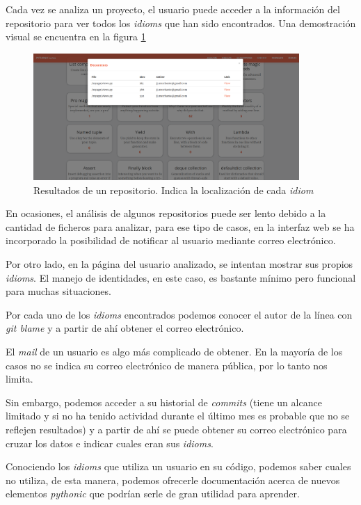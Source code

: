 \documentclass[a4paper, 12pt]{book}
\begin{document}
Cada vez se analiza un proyecto, el usuario puede acceder a la información del repositorio para ver todos los \textit{idioms} que han sido encontrados. Una demostración visual se encuentra en la figura \ref{fig:resultrepo}

\begin{figure}[H]
    \centering
    \includegraphics[width=0.9\textwidth]{img/1result_Repo2.png}
    \caption{Resultados de un repositorio. Indica la localización de cada \textit{idiom}}
    \label{fig:resultrepo}
\end{figure}

En ocasiones, el análisis de algunos repositorios puede ser lento debido a la cantidad de ficheros para analizar, para ese tipo de casos, en la interfaz web se ha incorporado la posibilidad de notificar al usuario mediante correo electrónico.

Por otro lado, en la página del usuario analizado, se intentan mostrar sus propios \textit{idioms}. El manejo de identidades, en este caso, es bastante mínimo pero funcional para muchas situaciones.

Por cada uno de los \textit{idioms} encontrados podemos conocer el autor de la línea con \textit{git blame} y a partir de ahí obtener el correo electrónico. 

El \textit{mail} de un usuario es algo más complicado de obtener. En la mayoría de los casos no se indica su correo electrónico de manera pública, por lo tanto nos limita.

Sin embargo, podemos acceder a su historial de \textit{commits} (tiene un alcance limitado y si no ha tenido actividad durante el último mes es probable que no se reflejen resultados) y a partir de ahí se puede obtener su correo electrónico para cruzar los datos e indicar cuales eran sus \textit{idioms}.

Conociendo los \textit{idioms} que utiliza un usuario en su código, podemos saber cuales no utiliza, de esta manera, podemos ofrecerle documentación acerca de nuevos elementos \textit{pythonic} que podrían serle de gran utilidad para aprender.
\end{document}
